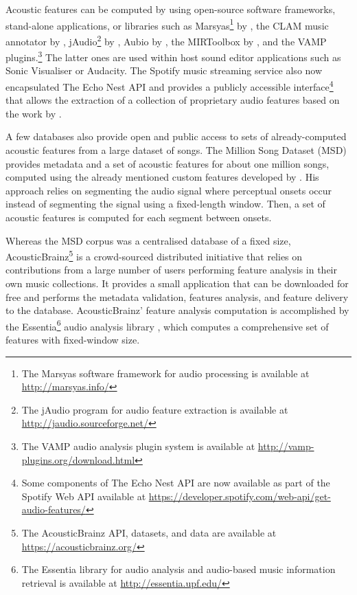 \begin{description}
Acoustic features can be computed by using open-source software frameworks, stand-alone applications, or libraries such as Marsyas\footnote{The Marsyas software framework for audio processing is available at \url{http://marsyas.info/}} by \textcite{tzanetakis00marsyas}, the CLAM music annotator by \textcite{amatriain05clam}, jAudio\footnote{The jAudio program for audio feature extraction is available at \url{http://jaudio.sourceforge.net/}} by \textcite{mckay10automatic}, Aubio by \textcite{brossier06automatic}, the MIRToolbox by \textcite{lartillot08matlab}, and the VAMP plugins.\footnote{The VAMP audio analysis plugin system is available at \url{http://vamp-plugins.org/download.html}} 
The latter ones are used within host sound editor applications such as Sonic Visualiser or Audacity. 
The Spotify music streaming service also now encapsulated The Echo Nest API and provides a publicly accessible interface\footnote{Some components of The Echo Nest API are now available as part of the Spotify Web API available at \url{https://developer.spotify.com/web-api/get-audio-features/}} that allows the extraction of a collection of proprietary audio features based on the work by \textcite{jehan05creating}.


A few databases also provide open and public access to sets of already-computed acoustic features from a large dataset of songs. 
The Million Song Dataset (MSD) \autocite{bertin11million} provides metadata and a set of acoustic features for about one million songs, computed using the already mentioned custom features developed by \citeauthor{jehan05creating}. His approach relies on segmenting the audio signal where perceptual onsets occur instead of segmenting the signal using a fixed-length window. Then, a set of acoustic features is computed for each segment between onsets. 



Whereas the MSD corpus was a centralised database of a fixed size, AcousticBrainz\footnote{The AcousticBrainz API, datasets, and data are available at \url{https://acousticbrainz.org/}} is a crowd-sourced distributed initiative that relies on contributions from a large number of users performing feature analysis in their own music collections\autocite{porter15acousticbrainz}. 
It provides a small application that can be downloaded for free and performs the metadata validation, features analysis, and feature delivery to the database. 
AcousticBrainz' feature analysis computation is accomplished by the Essentia\footnote{The Essentia library for audio analysis and audio-based music information retrieval is available at \url{http://essentia.upf.edu/}} audio analysis library \autocite{bogdanov13essentia}, which computes a comprehensive set of features with fixed-window size.


\end{description}
